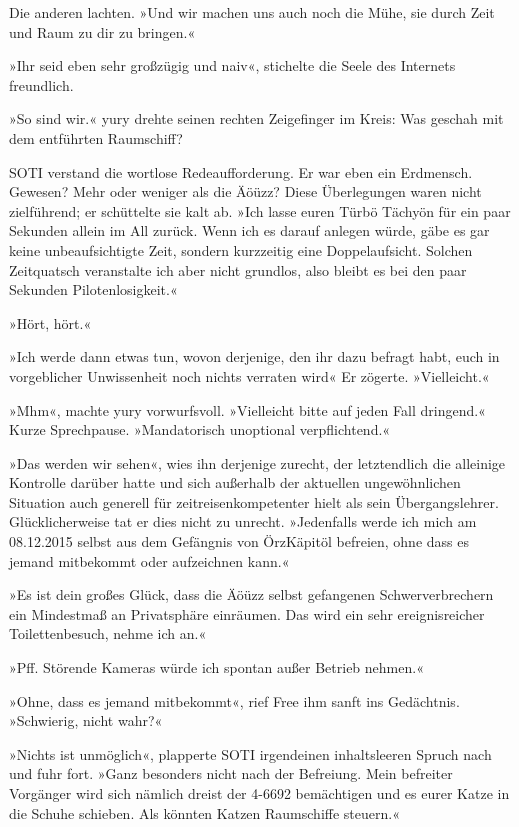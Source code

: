 Die anderen lachten. »Und wir machen uns auch noch die Mühe, sie durch Zeit und Raum zu dir zu bringen.«

»Ihr seid eben sehr großzügig und naiv«, stichelte die Seele des Internets freundlich.

»So sind wir.« yury drehte seinen rechten Zeigefinger im Kreis: Was geschah mit dem entführten Raumschiff?

SOTI verstand die wortlose Redeaufforderung. Er war eben ein Erdmensch. Gewesen? Mehr oder weniger als die Äöüzz? Diese Überlegungen waren nicht zielführend; er schüttelte sie kalt ab. »Ich lasse euren Türbö Tächyön für ein paar Sekunden allein im All zurück. Wenn ich es darauf anlegen würde, gäbe es gar keine unbeaufsichtigte Zeit, sondern kurzzeitig eine Doppelaufsicht. Solchen Zeitquatsch veranstalte ich aber nicht grundlos, also bleibt es bei den paar Sekunden Pilotenlosigkeit.«

»Hört, hört.«

»Ich werde dann etwas tun, wovon derjenige, den ihr dazu befragt habt, euch in vorgeblicher Unwissenheit noch nichts verraten wird« Er zögerte. »Vielleicht.«

»Mhm«, machte yury vorwurfsvoll. »Vielleicht bitte auf jeden Fall dringend.« Kurze Sprechpause. »Mandatorisch unoptional verpflichtend.«

»Das werden wir sehen«, wies ihn derjenige zurecht, der letztendlich die alleinige Kontrolle darüber hatte und sich außerhalb der aktuellen ungewöhnlichen Situation auch generell für zeitreisenkompetenter hielt als sein Übergangslehrer. Glücklicherweise tat er dies nicht zu unrecht. »Jedenfalls werde ich mich am 08.12.2015 selbst aus dem Gefängnis von ÖrzKäpitöl befreien, ohne dass es jemand mitbekommt oder aufzeichnen kann.«

»Es ist dein großes Glück, dass die Äöüzz selbst gefangenen Schwerverbrechern ein Mindestmaß an Privatsphäre einräumen. Das wird ein sehr ereignisreicher Toilettenbesuch, nehme ich an.«

»Pff. Störende Kameras würde ich spontan außer Betrieb nehmen.«

»Ohne, dass es jemand mitbekommt«, rief Free ihm sanft ins Gedächtnis. »Schwierig, nicht wahr?«

»Nichts ist unmöglich«, plapperte SOTI irgendeinen inhaltsleeren Spruch nach und fuhr fort. »Ganz besonders nicht nach der Befreiung. Mein befreiter Vorgänger wird sich nämlich dreist der 4-6692 bemächtigen und es eurer Katze in die Schuhe schieben. Als könnten Katzen Raumschiffe steuern.«

